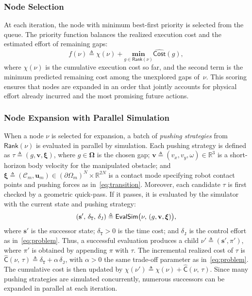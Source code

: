 \subsubsection{Node Selection}
At each iteration, the node with minimum best-first priority is selected from
the queue. The priority function balances the realized execution cost and the
estimated effort of remaining gaps:
\begin{equation}\label{eq:priority}
  f(\nu)\triangleq \chi(\nu)+\underset{g\in \textsf{Rank}(\nu)}{\textbf{min}}
  \widehat{\mathsf{Cost}}(g),
\end{equation}
where $\chi(\nu)$ is the cumulative execution cost so far, and the second term
is the minimum predicted remaining cost among the unexplored gaps of~$\nu$.
This scoring ensures that nodes are expanded in an order that jointly accounts
for physical effort already incurred and the most promising future actions.

\subsubsection{Node Expansion with Parallel Simulation}
When a node $\nu$ is selected for expansion, a batch of \emph{pushing
strategies} from $\mathsf{Rank}(\nu)$ is evaluated in parallel by simulation.
Each pushing strategy is defined as
\(\tau\triangleq(g,\mathbf{v},\boldsymbol{\xi})\), where
$g\in \boldsymbol{\Omega}$ is the chosen gap;
$\mathbf{v}\triangleq(v_x,v_y,\omega)\in \mathbb{R}^3$ is a short-horizon body
velocity for the manipulated obstacle;
and $\boldsymbol{\xi}\triangleq (\mathcal{C}_m,\mathbf{u}_m) \in (\partial\Omega_m)^N \times \mathbb{R}^{2N}$
is a contact mode specifying robot contact points and pushing forces as in~\eqref{eq:transition}.
Moreover, each candidate $\tau$ is first checked by a geometric quick-pass. If it passes,
it is evaluated by the simulator with the current state and pushing strategy:
\begin{equation}\label{eq:sim}
  (\mathbf{s}',\, \delta_\texttt{T},\, \delta_{\texttt{J}}) \triangleq \mathsf{EvalSim}
  \big{(}\nu,\, (g,\mathbf{v},\boldsymbol{\xi})\big{)},
\end{equation}
where $\mathbf{s}'$ is the successor state; $\delta_\texttt{T}>0$ is the time
cost; and $\delta_\texttt{J}$ is the control effort as in~\eqref{eq:problem}.
Thus, a successful evaluation produces a child
$\nu'\triangleq (\mathbf{s}',\pi')$, where $\pi'$ is obtained by appending
$\pi$ with $\tau$. The incremental realized cost of $\tau$ is
$\widehat{\mathsf{C}}(\nu,\,\tau)\triangleq \delta_\texttt{T} + \alpha\, \delta_\texttt{J}$,
with $\alpha>0$ the same trade-off parameter as in~\eqref{eq:problem}. The
cumulative cost is then updated by
$\chi(\nu')\triangleq \chi(\nu)+\widehat{\mathsf{C}}(\nu,\,\tau)$. Since many
pushing strategies are simulated concurrently, numerous successors can be
expanded in parallel at each iteration.

